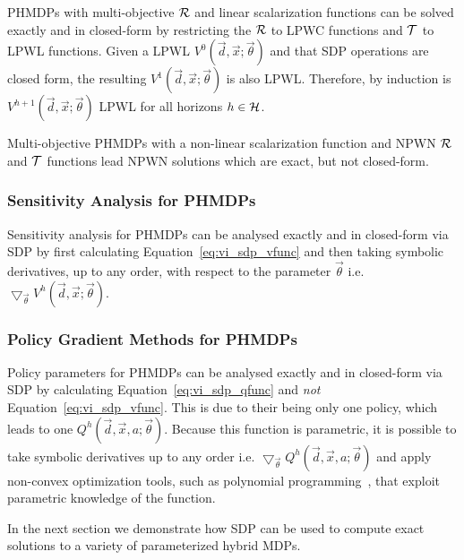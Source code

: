 PHMDPs with multi-objective {\footnotesize $\mathcal{R}$} and linear scalarization functions can be solved exactly and in closed-form by restricting the {\footnotesize $\mathcal{R}$} to LPWC functions and {\footnotesize $\mathcal{T}$} to LPWL functions. Given a LPWL {\footnotesize $V^{0}(\vec{d}, \vec{x}; \vec{\theta})$} and that SDP operations are closed form, the resulting {\footnotesize $V^{1}(\vec{d}, \vec{x}; \vec{\theta})$} is also LPWL. Therefore, by induction is {\footnotesize $V^{h+1}(\vec{d}, \vec{x}; \vec{\theta})$} LPWL for all horizons {\footnotesize $ h \in \mathcal{H} $}.

Multi-objective PHMDPs with a non-linear scalarization function and NPWN {\footnotesize $\mathcal{R}$} and {\footnotesize $\mathcal{T}$} functions lead NPWN solutions which are exact, but not closed-form\parencite{Sanner_UAI_2011}.

\subsubsection{Sensitivity Analysis for PHMDPs}


Sensitivity analysis for PHMDPs can be analysed exactly and in closed-form via SDP by first calculating Equation~\eqref{eq:vi_sdp_vfunc} and then taking symbolic derivatives, up to any order, with respect to the parameter {\footnotesize $\vec{\theta}$} i.e. {\footnotesize $\bigtriangledown_{\vec{\theta}} V^{h}\left(\vec{d}, \vec{x}; \vec{\theta}\right)$}.

\subsubsection{Policy Gradient Methods for PHMDPs}

Policy parameters for PHMDPs can be analysed exactly and in closed-form via SDP by calculating Equation~\eqref{eq:vi_sdp_qfunc} and \textit{not} Equation~\eqref{eq:vi_sdp_vfunc}. This is due to their being only one policy, which leads to one {\footnotesize $ Q^{h}(\vec{d}, \vec{x}, a; \vec{\theta}) $}. Because this function is parametric, it is possible to take symbolic derivatives up to any order i.e. {\footnotesize $\bigtriangledown_{\vec{\theta}} Q^{h}(\vec{d}, \vec{x}, a; \vec{\theta})$ } and apply non-convex optimization tools, such as polynomial programming~\parencite{sherali1992global}, that exploit parametric knowledge of the function.

In the next section we demonstrate how SDP can be used to compute exact solutions to a variety of parameterized hybrid MDPs.